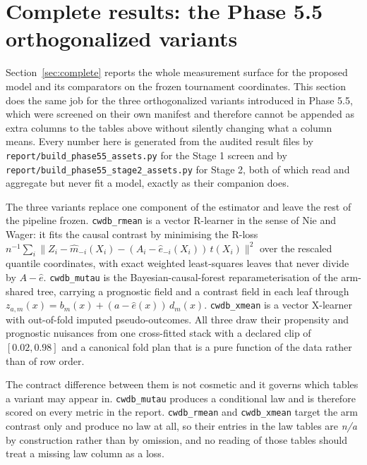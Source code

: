 \section{Complete results: the Phase 5.5 orthogonalized variants}
\label{sec:complete55}

Section~\ref{sec:complete} reports the whole measurement surface for the
proposed model and its comparators on the frozen tournament coordinates. This
section does the same job for the three orthogonalized variants introduced in
Phase 5.5, which were screened on their own manifest and therefore cannot be
appended as extra columns to the tables above without silently changing what a
column means. Every number here is generated from the audited result files by
\texttt{report/build\_phase55\_assets.py} for the Stage 1 screen and by
\texttt{report/build\_phase55\_stage2\_assets.py} for Stage 2, both of which
read and aggregate but never fit a model, exactly as their companion does.

The three variants replace one component of the estimator and leave the rest of
the pipeline frozen. \texttt{cwdb\_rmean} is a vector R-learner in the sense of
Nie and Wager: it fits the causal contrast by minimising the R-loss
$n^{-1}\sum_i \lVert Z_i - \hat m_{-i}(X_i) - (A_i - \hat e_{-i}(X_i))\,t(X_i)
\rVert^2$ over the rescaled quantile coordinates, with exact weighted
least-squares leaves that never divide by $A - \hat e$. \texttt{cwdb\_mutau} is
the Bayesian-causal-forest reparameterisation of the arm-shared tree, carrying a
prognostic field and a contrast field in each leaf through $z_{a,m}(x) = b_m(x)
+ (a - \hat e(x))\,d_m(x)$. \texttt{cwdb\_xmean} is a vector X-learner with
out-of-fold imputed pseudo-outcomes. All three draw their propensity and
prognostic nuisances from one cross-fitted stack with a declared clip of
$[0.02, 0.98]$ and a canonical fold plan that is a pure function of the data
rather than of row order.

The contract difference between them is not cosmetic and it governs which
tables a variant may appear in. \texttt{cwdb\_mutau} produces a conditional law
and is therefore scored on every metric in the report. \texttt{cwdb\_rmean} and
\texttt{cwdb\_xmean} target the arm contrast only and produce no law at all, so
their entries in the law tables are \emph{n/a} by construction rather than by
omission, and no reading of those tables should treat a missing law column as a
loss.

